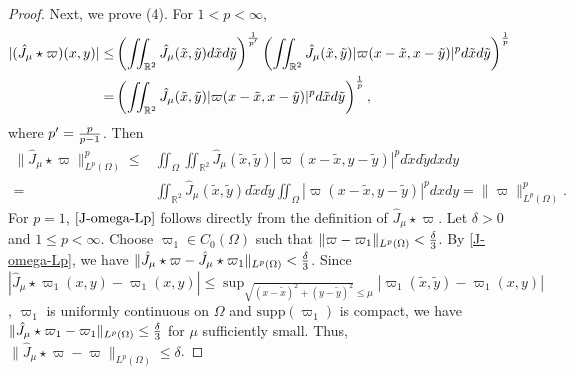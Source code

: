 \documentclass[1 [leqno, 11pt]{amsart}
\numberwithin{equation}{section}
\begin{document}
\begin{CJK*}{GBK}{song}
\begin{appendix}
\begin{proof}
Next, we prove (4). For $1<p<\infty$,
\begin{align}\nonumber
|(\hat J_{\mu}\star\varpi)(x,y)|\leq& \left(\iint_{\mathbb{R}^2}\hat  J_{\mu}(\tilde x,\tilde y)d\tilde x d\tilde y\right)^{1\over p'}\left(\iint_{\mathbb{R}^2}\hat J_{\mu}(\tilde x,\tilde y)|\varpi(x-\tilde x,x-\tilde y)|^p d\tilde xd\tilde y\right)^{1\over p}\\\label{hat-J-kappa-star-omega-estimate}
=&\left(\iint_{\mathbb{R}^2}\hat J_{\mu}(\tilde x,\tilde y)|\varpi(x-\tilde x,x-\tilde y)|^p d\tilde xd\tilde y\right)^{1\over p},
\end{align}
where $p'={p\over p-1}$. Then
\begin{align}\nonumber
\|\hat J_{\mu}\star\varpi\|_{L^p(\Omega)}^p\leq& \iint_\Omega\iint_{\mathbb{R}^2} \hat  J_{\mu}(\tilde x,\tilde y)|\varpi(x-\tilde x,y-\tilde y)|^p d\tilde xd\tilde y dxdy\\\label{J-omega-Lp}
=&\iint_{\mathbb{R}^2} \hat J_{\mu}(\tilde x,\tilde y)d\tilde xd\tilde y \iint_\Omega|\varpi(x-\tilde x,y-\tilde y)|^p  dxdy=\|\varpi\|_{L^p(\Omega)}^p.
\end{align}
For $p=1$, $\eqref{J-omega-Lp}$ follows directly from the definition of $\hat J_{\mu}\star\varpi$.
Let $\delta>0$ and $1\leq p<\infty$.
Choose $\varpi_1\in C_0(\Omega)$ such that $\|\varpi-\varpi_1\|_{L^p(\Omega)}<{\delta\over 3}$. By \eqref{J-omega-Lp}, we have $\|\hat J_{\mu}\star\varpi-\hat J_{\mu}\star\varpi_1\|_{L^p(\Omega)}<{\delta\over 3}$. Since $|\hat J_{\mu}\star\varpi_1(x,y)-\varpi_1(x,y)|\leq \sup_{\sqrt{(x-\tilde x)^2+(y-\tilde y)^2}\leq \mu}|\varpi_1(\tilde x,\tilde y)-\varpi_1(x,y)|$, $\varpi_1$ is uniformly continuous on $\Omega$ and $\text{supp}(\varpi_1)$ is compact, we have $\|\hat J_{\mu}\star\varpi_1-\varpi_1\|_{L^p(\Omega)}\leq {\delta\over 3}$ for $\mu$ sufficiently small. Thus, $\|\hat J_{\mu}\star\varpi-\varpi\|_{L^p(\Omega)}\leq \delta$.


\end{proof}
\end{appendix}
\end{CJK*}
\end{document}

